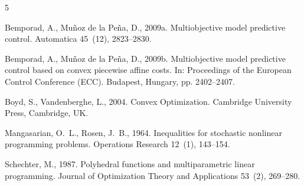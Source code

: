 \documentclass[review]{elsarticle}
\begin{document}

\begin{thebibliography}{5}

Bemporad, A., Mu\~noz de la Pe\~na, D., 2009a.
Multiobjective model predictive control.
Automatica 45~(12), 2823--2830.

Bemporad, A., Mu\~noz de la Pe\~na, D., 2009b.
Multiobjective model predictive control based on convex piecewise affine costs.
In: Proceedings of the European Control Conference (ECC). Budapest, Hungary,
pp. 2402--2407.

Boyd, S., Vandenberghe, L., 2004.
Convex Optimization.
Cambridge University Press, Cambridge, UK.

Mangasarian, O.~L., Rosen, J.~B., 1964.
Inequalities for stochastic nonlinear programming problems.
Operations Research 12~(1), 143--154.

Schechter, M., 1987.
Polyhedral functions and multiparametric linear programming.
Journal of Optimization Theory and Applications 53~(2), 269--280.

\end{thebibliography}
\end{document}
